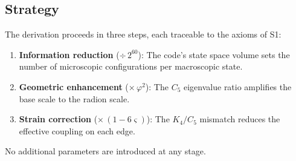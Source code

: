\documentclass[11pt,a4paper]{article}
\theoremstyle{definition}
\theoremstyle{remark}
\newcommand{\gr}{\varphi}
\newcommand{\gs}{\varsigma}
\begin{document}
\subsection{Strategy}

The derivation proceeds in three steps, each traceable to the axioms of S1:

\begin{enumerate}[nosep]
\item \textbf{Information reduction} ($\div\, 2^{60}$): The code's state space volume sets the number of microscopic configurations per macroscopic state.
\item \textbf{Geometric enhancement} ($\times\, \gr^2$): The $C_5$ eigenvalue ratio amplifies the base scale to the radion scale.
\item \textbf{Strain correction} ($\times\, (1-6\gs)$): The $K_4/C_5$ mismatch reduces the effective coupling on each edge.
\end{enumerate}

No additional parameters are introduced at any stage.
\end{document}
